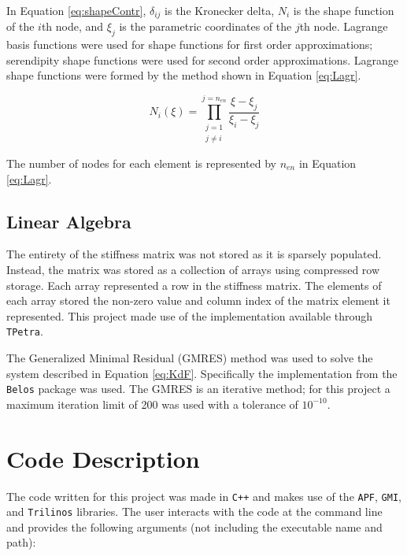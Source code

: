 \documentclass[a4paper, 12pt]{article}
\begin{document}
In Equation \ref{eq:shapeContr}, $\delta_{ij}$ is the Kronecker delta,
$N_i$ is the shape function of the $i$th node, and $\xi_j$ is the
parametric coordinates of the $j$th node. Lagrange basis functions
were used for shape functions for first order approximations;
serendipity shape functions were used for second order approximations.  Lagrange shape functions were formed by the method shown in
Equation \ref{eq:Lagr}.

\begin{equation} \label{eq:Lagr}
N_i(\xi) =
  \prod_
  { \substack{ j =    1    \\
               j \neq i } }
  ^{j = n_{en}}
  \frac
  { \xi   - \xi_{j} }
  { \xi_i - \xi_{j} }
\end{equation}

The number of nodes for each element is represented by $n_{en}$ in
Equation \ref{eq:Lagr}.

\subsection{Linear Algebra} \label{subsec:LinAlg}
The entirety of the stiffness matrix was not stored as it is
sparsely populated. Instead, the matrix was stored as a collection
of arrays using compressed row storage.
Each array represented a row in the stiffness matrix.
The elements of each array stored the non-zero value and column index of the
matrix element it represented. This project made use
of the implementation available through \texttt{TPetra}.

The Generalized Minimal Residual (GMRES) method was used to solve
the system described in Equation \ref{eq:KdF}. Specifically
the implementation from the \texttt{Belos} package was used.
The GMRES is an iterative method; for this project a maximum
iteration limit of 200 was used with a tolerance of $10^{-10}$.

\section{Code Description} \label{sec:codeDes}
The code written for this project was made in \texttt{C++}
and makes use of the \texttt{APF}, \texttt{GMI}, and
\texttt{Trilinos} libraries. The user interacts with
the code at the command line and provides the following
arguments (not including the executable name and path):
\end{document}
